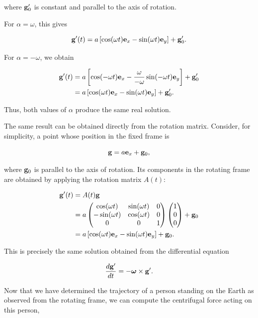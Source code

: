 \documentclass[12pt]{article}
\begin{document}
where $\vb g'_0$ is constant and parallel to the axis of rotation.

For $\alpha=\omega$, this gives

\[
  \vb g'(t)
  =
  a\left[
    \cos(\omega t)\vb e_x
    -
    \sin(\omega t)\vb e_y
  \right]
  +
  \vb g'_0.
\]

For $\alpha=-\omega$, we obtain

\[
\begin{aligned}
  \vb g'(t)
  &=
  a\left[
    \cos(-\omega t)\vb e_x
    -
    \frac{\omega}{-\omega}
    \sin(-\omega t)\vb e_y
  \right]
  +
  \vb g'_0
  \\
  &=
  a\left[
    \cos(\omega t)\vb e_x
    -
    \sin(\omega t)\vb e_y
  \right]
  +
  \vb g'_0.
\end{aligned}
\]

Thus, both values of $\alpha$ produce the same real solution.

The same result can be obtained directly from the rotation matrix. Consider,
for simplicity, a point whose position in the fixed frame is

\[
  \vb g=a\vb e_x+\vb g_0,
\]

where $\vb g_0$ is parallel to the axis of rotation. Its components in the
rotating frame are obtained by applying the rotation matrix $A(t)$:

\[
\begin{aligned}
  \vb g'(t)
  &=
  A(t)\vb g
  \\
  &=
  a
  \begin{pmatrix}
    \cos(\omega t) & \sin(\omega t) & 0 \\
    -\sin(\omega t) & \cos(\omega t) & 0 \\
    0 & 0 & 1
  \end{pmatrix}
  \begin{pmatrix}
    1\\
    0\\
    0
  \end{pmatrix}
  +
  \vb g_0
  \\
  &=
  a\left[
    \cos(\omega t)\vb e_x
    -
    \sin(\omega t)\vb e_y
  \right]
  +
  \vb g_0.
\end{aligned}
\]

This is precisely the same solution obtained from the differential equation

\[
  \frac{d\vb g'}{dt}
  =
  -\boldsymbol{\omega}\times\vb g'.
\]

Now that we have determined the trajectory of a person standing on the Earth
as observed from the rotating frame, we can compute the centrifugal force
acting on this person,
\end{document}
